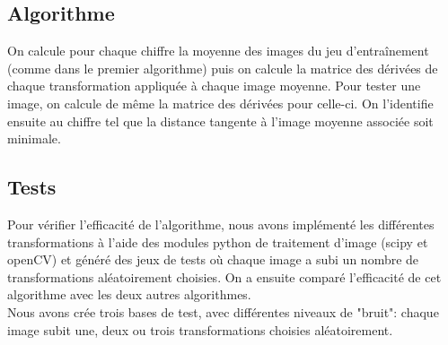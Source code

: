 \documentclass[a4paper,11pt,twoside]{report}
\begin{document}
\subsection{Algorithme}
On calcule pour chaque chiffre la moyenne des images du jeu d'entraînement (comme dans le premier algorithme) puis on calcule la matrice des dérivées de chaque transformation appliquée à chaque image moyenne. Pour tester une image, on calcule de même la matrice des dérivées pour celle-ci. On l'identifie ensuite au chiffre tel que la distance tangente à l'image moyenne associée soit minimale.



\subsection{Tests}
Pour vérifier l'efficacité de l'algorithme, nous avons implémenté les différentes transformations à l'aide des modules python de traitement d'image (scipy et openCV) et généré des jeux de tests où chaque image a subi un nombre de transformations aléatoirement choisies. On a ensuite comparé l'efficacité de cet algorithme avec les deux autres algorithmes.\\
Nous avons crée trois bases de test, avec différentes niveaux de "bruit": chaque image subit une, deux ou trois transformations choisies aléatoirement.
\end{document}
